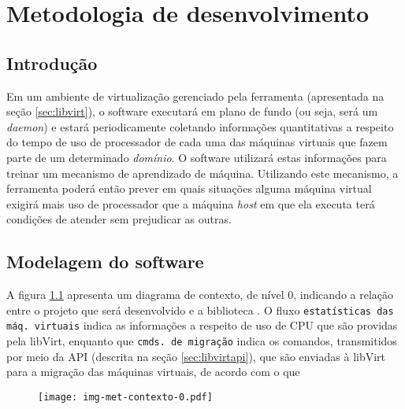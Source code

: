 %
%
%
% 
%
%

\chapter{Metodologia de desenvolvimento}\label{sec:meto}

\section{Introdução}

Em um ambiente de virtualização gerenciado pela ferramenta \libvirt
(apresentada na seção \ref{sec:libvirt}), o software executará em plano de
fundo (ou seja, será um \emph{daemon}) e estará periodicamente coletando
informações quantitativas a respeito do tempo de uso de processador de
cada uma das máquinas virtuais que fazem parte de um determinado
\emph{domínio}. O software utilizará estas informações para treinar um
mecanismo de aprendizado de máquina. Utilizando este mecanismo, a
ferramenta poderá então prever em quais situações alguma máquina virtual
exigirá mais uso de processador que a máquina \emph{host} em que ela
executa terá condições de atender sem prejudicar as outras.

\section{Modelagem do software}

A figura \ref{fig:contexto0} apresenta um diagrama de contexto, de nível 0,
indicando a relação entre o projeto que será desenvolvido e a biblioteca
\libvirt. O fluxo \texttt{estatísticas das máq. virtuais} indica as
informações a respeito de uso de CPU que são providas pela libVirt,
enquanto que \texttt{cmds. de migração} indica os comandos, transmitidos
por meio da API (descrita na seção \ref{sec:libvirtapi}), que são enviadas
à libVirt para a migração das máquinas virtuais, de acordo com o que 

\begin{figure}
\centering
\texttt{[image: img-met-contexto-0.pdf]}
\label{fig:contexto0}
\end{figure}

